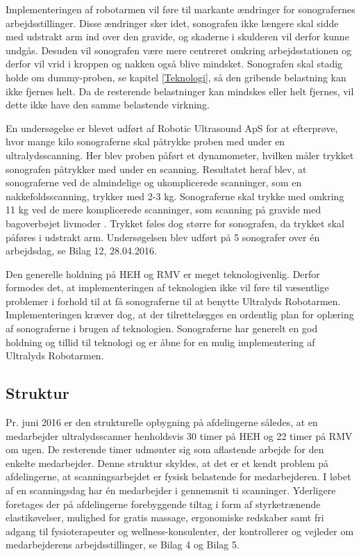 Implementeringen af robotarmen vil føre til markante ændringer for sonografernes arbejdsstillinger. Disse ændringer sker idet, sonografen ikke længere skal sidde med udstrakt arm ind over den gravide, og skaderne i skulderen vil derfor kunne undgås. Desuden vil sonografen være mere centreret omkring arbejdsstationen og derfor vil vrid i kroppen og nakken også blive mindsket. Sonografen skal stadig holde om dummy-proben, se kapitel \ref{Teknologi}, så den gribende belastning kan ikke fjernes helt. Da de resterende belastninger kan mindskes eller helt fjernes, vil dette ikke have den samme belastende virkning. 

En undersøgelse er blevet udført af Robotic Ultrasound ApS for at efterprøve, hvor mange kilo sonograferne skal påtrykke proben med under en ultralydsscanning. Her blev proben påført et dynamometer, hvilken måler trykket sonografen påtrykker med under en scanning. Resultatet heraf blev, at sonograferne ved de almindelige og ukomplicerede scanninger, som en nakkefoldsscanning, trykker med 2-3 kg. Sonograferne skal trykke med omkring 11 kg ved de mere komplicerede scanninger, som scanning på gravide med bagoverbøjet livmoder \cite{livmoder}. Trykket føles dog større for sonografen, da trykket skal påføres i udstrakt arm. Undersøgelsen blev udført på 5 sonografer over én arbejdsdag, se Bilag 12, 28.04.2016.

Den generelle holdning på HEH og RMV er meget teknologivenlig. Derfor formodes det, at implementeringen af teknologien ikke vil føre til væsentlige problemer i forhold til at få sonograferne til at benytte Ultralyds Robotarmen. Implementeringen kræver dog, at der tilrettelægges en ordentlig plan for oplæring af sonograferne i brugen af teknologien. Sonograferne har generelt en god holdning og tillid til teknologi og er åbne for en mulig implementering af Ultralyds Robotarmen.

\subsection{Struktur}
Pr. juni 2016 er den strukturelle opbygning på afdelingerne således, at en medarbejder ultralydsscanner henholdsvis 30 timer på HEH og 22 timer på RMV om ugen. De resterende timer udmønter sig som aflastende arbejde for den enkelte medarbejder. Denne struktur skyldes, at det er et kendt problem på afdelingerne, at scanningsarbejdet er fysisk belastende for medarbejderen. I løbet af en scanningsdag har én medarbejder i gennemsnit ti scanninger. Yderligere foretages der på afdelingerne forebyggende tiltag i form af styrketrænende elastikøvelser, mulighed for gratis massage, ergonomiske redskaber samt fri adgang til fysioterapeuter og wellness-konsulenter, der kontrollerer og vejleder om medarbejderens arbejdsstillinger, se Bilag 4 og Bilag 5.

